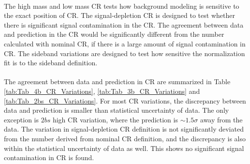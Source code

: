\paragraph{}
The high mass and low mass CR tests how background modeling is sensitive to the exact position of CR. 
The signal-depletion CR is designed to test whether there is significant signal contamination in the CR. 
The agreement between data and prediction in the CR would be significantly different from the number calculated with nominal CR, if there is a large amount of signal contamination in CR. 
The sideband variations are designed to test how sensitive the normalization fit is to the sideband definition.

\paragraph{}
The agreement between data and prediction in CR are summarized in Table \ref{tab:Tab_4b_CR_Variations}, \ref{tab:Tab_3b_CR_Variations} and \ref{tab:Tab_2bs_CR_Variations}.
For most CR variations, the discrepancy between data and prediction is smaller than statistical uncertainty of data. 
The only exception is $2bs$ high CR variation, where the prediction is $\sim 1.5 \sigma$ away from the data.
The variation in signal-depletion CR definition is not significantly deviated from the number derived from nominal CR definition, and the discrepancy is also within the statistical uncertainty of data as well.
This shows no significant signal contamination in CR is found.

